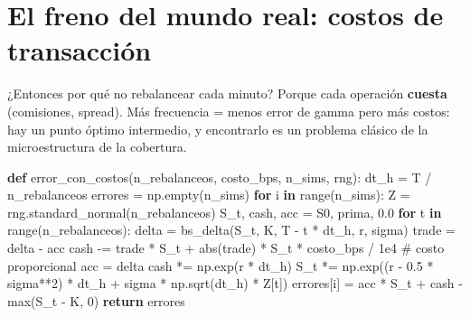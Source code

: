 \documentclass[
  spanish,
  letterpaper,
  DIV=11,
  numbers=noendperiod]{scrreprt}
\newenvironment{Shaded}{\begin{snugshade}}{\end{snugshade}}
\newcommand{\BuiltInTok}[1]{\textcolor[rgb]{0.00,0.23,0.31}{#1}}
\newcommand{\CommentTok}[1]{\textcolor[rgb]{0.37,0.37,0.37}{#1}}
\newcommand{\ControlFlowTok}[1]{\textcolor[rgb]{0.00,0.23,0.31}{\textbf{#1}}}
\newcommand{\DecValTok}[1]{\textcolor[rgb]{0.68,0.00,0.00}{#1}}
\newcommand{\FloatTok}[1]{\textcolor[rgb]{0.68,0.00,0.00}{#1}}
\newcommand{\KeywordTok}[1]{\textcolor[rgb]{0.00,0.23,0.31}{\textbf{#1}}}
\newcommand{\NormalTok}[1]{\textcolor[rgb]{0.00,0.23,0.31}{#1}}
\newcommand{\OperatorTok}[1]{\textcolor[rgb]{0.37,0.37,0.37}{#1}}
\begin{document}
\section{El freno del mundo real: costos de
transacción}\label{el-freno-del-mundo-real-costos-de-transacciuxf3n}

¿Entonces por qué no rebalancear cada minuto? Porque cada operación
\textbf{cuesta} (comisiones, spread). Más frecuencia = menos error de
gamma pero más costos: hay un punto óptimo intermedio, y encontrarlo es
un problema clásico de la microestructura de la cobertura.

\label{costos}
\begin{Shaded}
\begin{Highlighting}[]
\KeywordTok{def}\NormalTok{ error\_con\_costos(n\_rebalanceos, costo\_bps, n\_sims, rng):}
\NormalTok{    dt\_h }\OperatorTok{=}\NormalTok{ T }\OperatorTok{/}\NormalTok{ n\_rebalanceos}
\NormalTok{    errores }\OperatorTok{=}\NormalTok{ np.empty(n\_sims)}
    \ControlFlowTok{for}\NormalTok{ i }\KeywordTok{in} \BuiltInTok{range}\NormalTok{(n\_sims):}
\NormalTok{        Z }\OperatorTok{=}\NormalTok{ rng.standard\_normal(n\_rebalanceos)}
\NormalTok{        S\_t, cash, acc }\OperatorTok{=}\NormalTok{ S0, prima, }\FloatTok{0.0}
        \ControlFlowTok{for}\NormalTok{ t }\KeywordTok{in} \BuiltInTok{range}\NormalTok{(n\_rebalanceos):}
\NormalTok{            delta }\OperatorTok{=}\NormalTok{ bs\_delta(S\_t, K, T }\OperatorTok{{-}}\NormalTok{ t }\OperatorTok{*}\NormalTok{ dt\_h, r, sigma)}
\NormalTok{            trade }\OperatorTok{=}\NormalTok{ delta }\OperatorTok{{-}}\NormalTok{ acc}
\NormalTok{            cash }\OperatorTok{{-}=}\NormalTok{ trade }\OperatorTok{*}\NormalTok{ S\_t }\OperatorTok{+} \BuiltInTok{abs}\NormalTok{(trade) }\OperatorTok{*}\NormalTok{ S\_t }\OperatorTok{*}\NormalTok{ costo\_bps }\OperatorTok{/} \FloatTok{1e4}  \CommentTok{\# costo proporcional}
\NormalTok{            acc }\OperatorTok{=}\NormalTok{ delta}
\NormalTok{            cash }\OperatorTok{*=}\NormalTok{ np.exp(r }\OperatorTok{*}\NormalTok{ dt\_h)}
\NormalTok{            S\_t }\OperatorTok{*=}\NormalTok{ np.exp((r }\OperatorTok{{-}} \FloatTok{0.5} \OperatorTok{*}\NormalTok{ sigma}\OperatorTok{**}\DecValTok{2}\NormalTok{) }\OperatorTok{*}\NormalTok{ dt\_h }\OperatorTok{+}\NormalTok{ sigma }\OperatorTok{*}\NormalTok{ np.sqrt(dt\_h) }\OperatorTok{*}\NormalTok{ Z[t])}
\NormalTok{        errores[i] }\OperatorTok{=}\NormalTok{ acc }\OperatorTok{*}\NormalTok{ S\_t }\OperatorTok{+}\NormalTok{ cash }\OperatorTok{{-}} \BuiltInTok{max}\NormalTok{(S\_t }\OperatorTok{{-}}\NormalTok{ K, }\DecValTok{0}\NormalTok{)}
    \ControlFlowTok{return}\NormalTok{ errores}


\end{Highlighting}
\end{Shaded}
\end{document}
